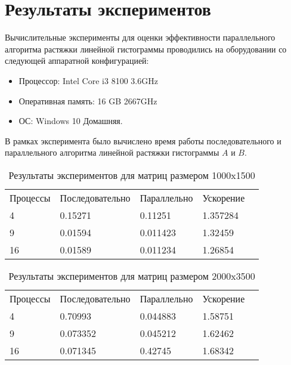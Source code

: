 \documentclass{report}
\begin{document}
\section*{Результаты экспериментов}
Вычислительные эксперименты для оценки эффективности параллельного алгоритма растяжки линейной гистограммы проводились на оборудовании со следующей аппаратной конфигурацией:

\begin{itemize}
\item Процессор: Intel Core i3 8100 3.6GHz
\item Оперативная память: 16 GB 2667GHz
\item ОС: Windows 10 Домашняя.
\end{itemize}

\par В рамках эксперимента было вычислено время работы последовательного и параллельного алгоритма линейной растяжки гистограммы {\itshape $A$} и {\itshape $B$}.
\begin{table}[!h]
\caption{Результаты экспериментов для матриц размером 1000x1500}
\centering
\begin{tabular}{lllll}
Процессы & Последовательно & Параллельно & Ускорение  \\
4        & 0.15271        & 0.11251   & 1.357284       \\
9        & 0.01594        & 0.011423    & 1.32459       \\
16       & 0.01589      & 0.011234    & 1.26854       
\end{tabular}
\end{table}

\begin{table}[!h]
\caption{Результаты экспериментов для матриц размером 2000x3500}
\centering
\begin{tabular}{lllll}
Процессы & Последовательно & Параллельно & Ускорение  \\
4        & 0.70993       & 0.044883    & 1.58751      \\
9        & 0.073352       & 0.045212   & 1.62462      \\
16       & 0.071345       & 0.42745    & 1.68342      
\end{tabular}
\end{table}
\end{document}

